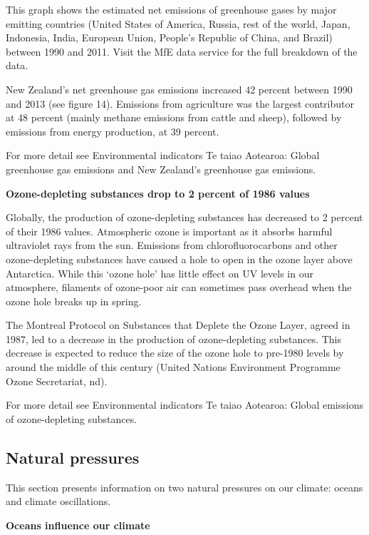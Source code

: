 \documentclass[11pt]{article} %
\begin{document}
This graph shows the estimated net emissions of greenhouse gases by major emitting countries (United States of America, Russia, rest of the world, Japan, Indonesia, India, European Union, People’s Republic of China, and Brazil) between 1990 and 2011. Visit the MfE data service for the full breakdown of the data.

New Zealand’s net greenhouse gas emissions increased 42 percent between 1990 and 2013 (see figure 14). Emissions from agriculture was the largest contributor at 48 percent (mainly methane emissions from cattle and sheep), followed by emissions from energy production, at 39 percent.


For more detail see Environmental indicators Te taiao Aotearoa: Global greenhouse gas emissions and New Zealand’s greenhouse gas emissions.

\textbf{Ozone-depleting substances drop to 2 percent of 1986 values}

Globally, the production of ozone-depleting substances has decreased to 2 percent of their 1986 values. Atmospheric ozone is important as it absorbs harmful ultraviolet rays from the sun. Emissions from chlorofluorocarbons and other ozone-depleting substances have caused a hole to open in the ozone layer above Antarctica. While this ‘ozone hole’ has little effect on UV levels in our atmosphere, filaments of ozone-poor air can sometimes pass overhead when the ozone hole breaks up in spring.

The Montreal Protocol on Substances that Deplete the Ozone Layer, agreed in 1987, led to a decrease in the production of ozone-depleting substances. This decrease is expected to reduce the size of the ozone hole to pre-1980 levels by around the middle of this century (United Nations Environment Programme Ozone Secretariat, nd).

For more detail see Environmental indicators Te taiao Aotearoa: Global emissions of ozone-depleting substances.

\subsection{Natural pressures}
This section presents information on two natural pressures on our climate: oceans and climate oscillations.

\textbf{Oceans influence our climate}
\end{document}
